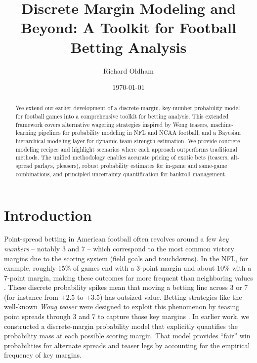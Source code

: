 \documentclass[12pt]{article}
\begin{document}
\title{Discrete Margin Modeling and Beyond: A Toolkit for Football Betting Analysis}
\author{Richard Oldham}
\date{\today}
\maketitle

\begin{abstract}
We extend our earlier development of a discrete-margin, key-number probability model for football games into a comprehensive toolkit for betting analysis. This extended framework covers alternative wagering strategies inspired by Wong teasers, machine-learning pipelines for probability modeling in NFL and NCAA football, and a Bayesian hierarchical modeling layer for dynamic team strength estimation. We provide concrete modeling recipes and highlight scenarios where each approach outperforms traditional methods. The unified methodology enables accurate pricing of exotic bets (teasers, alt-spread parlays, pleasers), robust probability estimates for in-game and same-game combinations, and principled uncertainty quantification for bankroll management. 
\end{abstract}

\section{Introduction}
Point-spread betting in American football often revolves around a few \emph{key numbers} – notably 3 and 7 – which correspond to the most common victory margins due to the scoring system (field goals and touchdowns). In the NFL, for example, roughly 15\% of games end with a 3-point margin and about 10\% with a 7-point margin, making these outcomes far more frequent than neighboring values \cite{Walsh2024}. These discrete probability spikes mean that moving a betting line across 3 or 7 (for instance from $+2.5$ to $+3.5$) has outsized value. Betting strategies like the well-known \emph{Wong teaser} were designed to exploit this phenomenon by teasing point spreads through 3 and 7 to capture those key margins \cite{Wong2001}. In earlier work, we constructed a discrete-margin probability model that explicitly quantifies the probability mass at each possible scoring margin. That model provides ``fair'' win probabilities for alternate spreads and teaser legs by accounting for the empirical frequency of key margins. 
\end{document}

